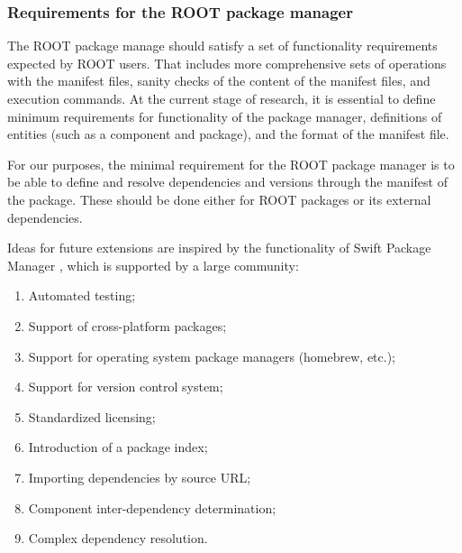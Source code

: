 \documentclass{webofc}
\begin{document}

\subsubsection{Requirements for the ROOT package manager}

The ROOT package manage should satisfy a set of functionality requirements expected by ROOT users. That includes more comprehensive sets of operations with the manifest files, sanity checks of the content of the manifest files, and execution commands. At the current stage of research, it is essential to define minimum requirements for functionality of the package manager, definitions of entities (such as  a component and package), and the format of the manifest file. 

For our purposes, the minimal requirement for the ROOT package manager is to be able to define and resolve dependencies and versions through the manifest of the package. These should be done either for ROOT packages or its external dependencies. 

Ideas for future extensions are inspired by the functionality of Swift Package Manager \cite{swiftpm}, which is supported by a large  community:
\begin{enumerate}
\item Automated testing; 
\item Support of cross-platform packages;
\item Support for operating system package managers (homebrew, etc.);
\item Support for version control system;
\item Standardized licensing;
\item Introduction of a package index;
\item Importing dependencies by source URL;
\item Component inter-dependency determination;
\item Complex dependency resolution.
\end{enumerate}
\end{document}
